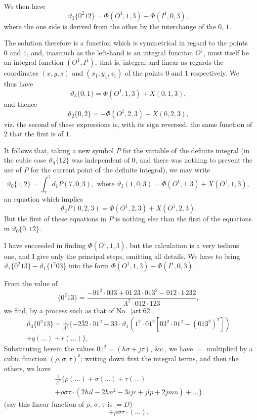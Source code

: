 \documentclass[11pt,a4paper]{book}
\begin{document}
We then have
\[
\vartheta_3\{0^2 12\} = \Phi(O^1, 1, 3) - \Phi(I^1, 0, 3),
\]
where the one side is derived from the other by the interchange of the $0$, $1$.

The solution therefore is a function which is symmetrical in regard to the points $0$ and $1$, and, inasmuch as the left-hand is an integral function $O^1$, must itself be an integral function $(O^1, I^1)$, that is, integral and linear as regards the coordinates $(x, y, z)$ and $(x_1, y_1, z_1)$ of the points $0$ and $1$ respectively. We thus have
\[
\vartheta_3\{0, 1\} = \Phi(O^1, 1, 3) + X(0, 1, 3),
\]
and thence
\[
\vartheta_2\{0, 2\} = -\Phi(O^1, 2, 3) - X(0, 2, 3),
\]
viz. the second of these expressions is, with its sign reversed, the same function of $2$ that the first is of $1$.

\begin{art}\label{art:65}
It follows that, taking a new symbol $P$ for the variable of the definite integral (in the cubic case $\vartheta_0\{12\}$ was independent of $0$, and there was nothing to prevent the use of $P$ for the current point of the definite integral), we may write
\[
\vartheta_0\{1, 2\} = \int_2^1 d_1 P(7, 0, 3), \text{ where } \vartheta_3(1, 0, 3) = \Phi(O^1, 1, 3) + X(O^1, 1, 3),
\]
an equation which implies
\[
\vartheta_2 P(0, 2, 3) = \Phi(O^1, 2, 3) + X(O^1, 2, 3).
\]
But the first of these equations in $P$ is nothing else than the first of the equations in $\vartheta_0\{0, 12\}$.
\end{art}

\begin{art}\label{art:66}
I have succeeded in finding $\Phi(O^1, 1, 3)$, but the calculation is a very tedious one, and I give only the principal steps, omitting all details. We have to bring $\vartheta_1\{0^2 13\} - \vartheta_1\{1^2 03\}$ into the form $\Phi(O^1, 1, 3) - \Phi(I^1, 0, 3)$.
\end{art}

\newpage
\begin{art}\label{art:67}
From the value of
\[
\{0^2 13\} = \frac{-01^2 \cdot 033 + 01\,23 \cdot 013^2 - 012 \cdot 1\,232}{\Lambda^2 \cdot 012 \cdot 123},
\]
we find, by a process such as that of No.~\ref{art:62},
\begin{multline*}
\vartheta_3\{0^2 13\} = \frac{1}{\Lambda^5}\{-\overline{232} \cdot 01^2 - 33 \cdot \vartheta_1(1^2 \cdot 01^2 [03^2 \cdot 01^2 - (013^2)^2]) \\
+ q(\ldots) + r(\ldots)\},
\end{multline*}
Substituting herein the values $01^2 = (h\sigma + j\tau)$, \&c., we have $= $ multiplied by a cubic function $(\rho, \sigma, \tau)^3$; writing down first the integral terms, and then the others, we have
\begin{multline*}
\frac{1}{\Lambda^5}\{\rho(\ldots) + \sigma(\ldots) + \tau(\ldots)\\
+ \rho\sigma\tau \cdot (2hil - 2hn^2 - 3ijr + jlp + 2jmn) + \ldots\}
\end{multline*}
(say this linear function of $\rho$, $\sigma$, $\tau$ is $= D$)
\[
+ \rho\sigma\tau \cdot (\ldots).
\]
\end{art}
\end{document}
